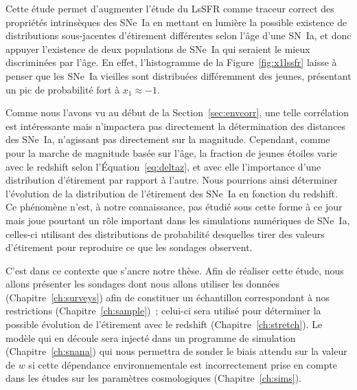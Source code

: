 \documentclass[../main/main.tex]{subfiles}
\begin{document}
Cette étude permet d'augmenter l'étude du LsSFR comme traceur correct des
propriétés intrinsèques des SNe~Ia en mettant en lumière la possible existence
de distributions sous-jacentes d'étirement différentes selon l'âge d'une SN~Ia,
et donc appuyer l'existence de deux populations de SNe~Ia qui seraient le mieux
discriminées par l'âge. En effet, l'histogramme de la Figure~\ref{fig:x1lssfr}
laisse à penser que les SNe~Ia vieilles sont distribuées différemment des
jeunes, présentant un pic de probabilité fort à $x_1 \approx -1$.

Comme nous l'avons vu au début de la Section~\ref{sec:envcorr}, une telle
corrélation est intéressante mais n'impactera pas directement la détermination
des distances des SNe~Ia, n'agissant pas directement sur la magnitude.
Cependant, comme pour la marche de magnitude basée sur l'âge, la fraction de
jeunes étoiles varie avec le redshift selon l'Équation~\ref{eq:deltaz}, et avec
elle l'importance d'une distribution d'étirement par rapport à l'autre. Nous
pourrions ainsi déterminer l'évolution de la distribution de l'étirement des
SNe~Ia en fonction du redshift. Ce phénomène n'est, à notre connaissance, pas
étudié sous cette forme à ce jour mais joue pourtant un rôle important dans les
simulations numériques de SNe~Ia, celles-ci utilisant des distributions de
probabilité desquelles tirer des valeurs d'étirement pour reproduire ce que les
sondages observent.

C'est dans ce contexte que s'ancre notre thèse. Afin de réaliser cette étude,
nous allons présenter les sondages dont nous allons utiliser les données
(Chapitre~\ref{ch:surveys}) afin de constituer un échantillon correspondant à
nos restrictions (Chapitre~\ref{ch:sample})~; celui-ci sera utilisé pour
déterminer la possible évolution de l'étirement avec le redshift
(Chapitre~\ref{ch:stretch}). Le modèle qui en découle sera injecté dans un
programme de simulation (Chapitre~\ref{ch:snana}) qui nous permettra de sonder
le biais attendu sur la valeur de $w$ si cette dépendance environnementale est
incorrectement prise en compte dans les études sur les paramètres cosmologiques
(Chapitre~\ref{ch:sims}).

\clearpage

\thispagestyle{plain}
\vspace*{\fill}
\minilof
\vspace*{\fill}

% 
% 
\end{document}
